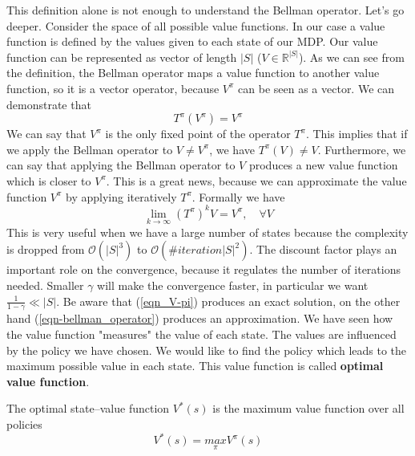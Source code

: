 \documentclass[../main.tex]{subfiles}
\begin{document}
This definition alone is not enough to understand the Bellman operator. Let's go deeper. Consider the space of all possible value functions. In our case a value function is defined by the values given to each state of our MDP. Our value function can be represented as vector of length $|S|$ ($V \in \mathbb{R}^{|S|}$). As we can see from the definition, the Bellman operator maps a value function to another value function, so it is a vector operator, because $V^{\pi}$ can be seen as a vector. We can demonstrate that
\begin{equation}
    T^{\pi}(V^{\pi}) = V^{\pi}
\end{equation}
We can say that $V^{\pi}$ is the only fixed point\footnotemark {} of the operator $T^{\pi}$. This implies that if we apply the Bellman operator to $V \neq V^{\pi}$, we have $T^{\pi}(V) \neq V$. Furthermore, we can say that applying the Bellman operator to $V$ produces a new value function which is closer to $V^{\pi}$. This is a great news, because we can approximate the value function $V^{\pi}$ by applying iteratively $T^{\pi}$. Formally we have
\begin{equation}
    \lim_{k \rightarrow \infty} (T^{\pi})^k V = V^{\pi}, \quad \forall V \label{eqn-bellman_operator}
\end{equation}
This is very useful when we have a large number of states because the complexity is dropped from $\mathcal{O}(|S|^3)$ to $\mathcal{O}(\#iteration|S|^2)$. The discount factor plays an important role on the convergence, because it regulates the number of iterations needed. Smaller $\gamma$ will make the convergence faster, in particular we want $\frac{1}{1-\gamma} \ll |S|$.
Be aware that (\ref{eqn_V-pi}) produces an exact solution, on the other hand (\ref{eqn-bellman_operator}) produces an approximation.
\newline
We have seen how the value function "measures" the value of each state. The values are influenced by the policy we have chosen. We would like to find the policy which leads to the maximum possible value in each state. This value function is called \textbf{optimal value function}.
\begin{definition}
    The optimal state–value function $V^*(s)$ is the maximum value function over all policies
    \begin{equation}
        V^*(s) = \underset{\pi}{max} V^{\pi}(s)
    \end{equation}
\end{definition}
\end{document}
